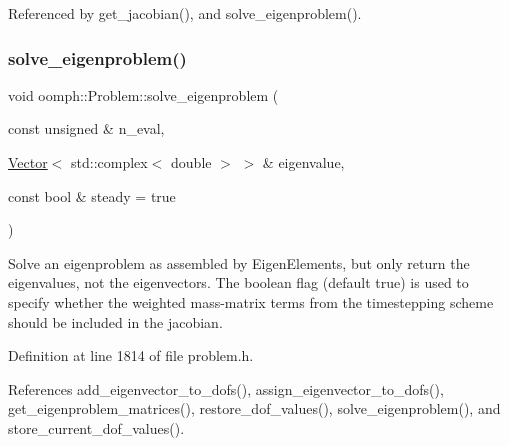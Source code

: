 Referenced by get\+\_\+jacobian(), and solve\+\_\+eigenproblem().

\mbox{\label{classoomph_1_1Problem_ad5d881c57b626a2e85d2e3dd292c575f}} 
\subsubsection{\texorpdfstring{solve\+\_\+eigenproblem()}{solve\_eigenproblem()}\hspace{0.1cm}{\footnotesize\ttfamily [2/2]}}
{\footnotesize\ttfamily void oomph\+::\+Problem\+::solve\+\_\+eigenproblem (\begin{DoxyParamCaption}\item[{const unsigned \&}]{n\+\_\+eval,  }\item[{\hyperlink{classoomph_1_1Vector}{Vector}$<$ std\+::complex$<$ double $>$ $>$ \&}]{eigenvalue,  }\item[{const bool \&}]{steady = {\ttfamily true} }\end{DoxyParamCaption})\hspace{0.3cm}{\ttfamily [inline]}}



Solve an eigenproblem as assembled by Eigen\+Elements, but only return the eigenvalues, not the eigenvectors. The boolean flag (default true) is used to specify whether the weighted mass-\/matrix terms from the timestepping scheme should be included in the jacobian. 



Definition at line 1814 of file problem.\+h.



References add\+\_\+eigenvector\+\_\+to\+\_\+dofs(), assign\+\_\+eigenvector\+\_\+to\+\_\+dofs(), get\+\_\+eigenproblem\+\_\+matrices(), restore\+\_\+dof\+\_\+values(), solve\+\_\+eigenproblem(), and store\+\_\+current\+\_\+dof\+\_\+values().

\mbox{\label{classoomph_1_1Problem_a072f2894b20672be1a48783684c4a50b}} 

